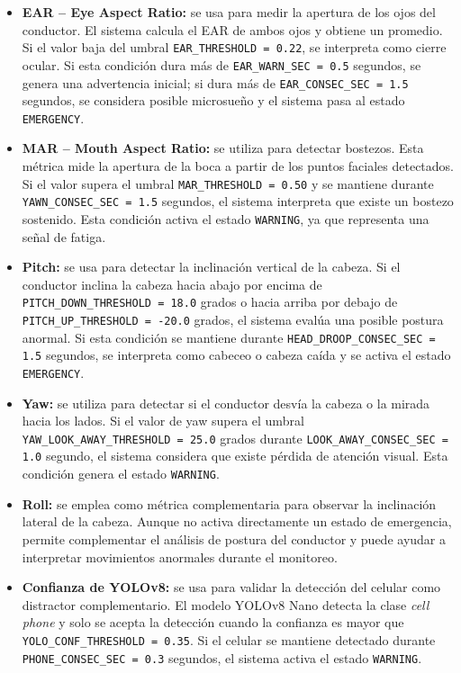 \documentclass[conference]{IEEEtran}
\begin{document}
\begin{itemize}
    \item \textbf{EAR -- Eye Aspect Ratio:} se usa para medir la apertura de los ojos del conductor. El sistema calcula el EAR de ambos ojos y obtiene un promedio. Si el valor baja del umbral \texttt{EAR\_THRESHOLD = 0.22}, se interpreta como cierre ocular. Si esta condición dura más de \texttt{EAR\_WARN\_SEC = 0.5} segundos, se genera una advertencia inicial; si dura más de \texttt{EAR\_CONSEC\_SEC = 1.5} segundos, se considera posible microsueño y el sistema pasa al estado \texttt{EMERGENCY}.

    \item \textbf{MAR -- Mouth Aspect Ratio:} se utiliza para detectar bostezos. Esta métrica mide la apertura de la boca a partir de los puntos faciales detectados. Si el valor supera el umbral \texttt{MAR\_THRESHOLD = 0.50} y se mantiene durante \texttt{YAWN\_CONSEC\_SEC = 1.5} segundos, el sistema interpreta que existe un bostezo sostenido. Esta condición activa el estado \texttt{WARNING}, ya que representa una señal de fatiga.

    \item \textbf{Pitch:} se usa para detectar la inclinación vertical de la cabeza. Si el conductor inclina la cabeza hacia abajo por encima de \texttt{PITCH\_DOWN\_THRESHOLD = 18.0} grados o hacia arriba por debajo de \texttt{PITCH\_UP\_THRESHOLD = -20.0} grados, el sistema evalúa una posible postura anormal. Si esta condición se mantiene durante \texttt{HEAD\_DROOP\_CONSEC\_SEC = 1.5} segundos, se interpreta como cabeceo o cabeza caída y se activa el estado \texttt{EMERGENCY}.

    \item \textbf{Yaw:} se utiliza para detectar si el conductor desvía la cabeza o la mirada hacia los lados. Si el valor de yaw supera el umbral \texttt{YAW\_LOOK\_AWAY\_THRESHOLD = 25.0} grados durante \texttt{LOOK\_AWAY\_CONSEC\_SEC = 1.0} segundo, el sistema considera que existe pérdida de atención visual. Esta condición genera el estado \texttt{WARNING}.

    \item \textbf{Roll:} se emplea como métrica complementaria para observar la inclinación lateral de la cabeza. Aunque no activa directamente un estado de emergencia, permite complementar el análisis de postura del conductor y puede ayudar a interpretar movimientos anormales durante el monitoreo.

    \item \textbf{Confianza de YOLOv8:} se usa para validar la detección del celular como distractor complementario. El modelo YOLOv8 Nano detecta la clase \textit{cell phone} y solo se acepta la detección cuando la confianza es mayor que \texttt{YOLO\_CONF\_THRESHOLD = 0.35}. Si el celular se mantiene detectado durante \texttt{PHONE\_CONSEC\_SEC = 0.3} segundos, el sistema activa el estado \texttt{WARNING}.


\end{itemize}
\end{document}
